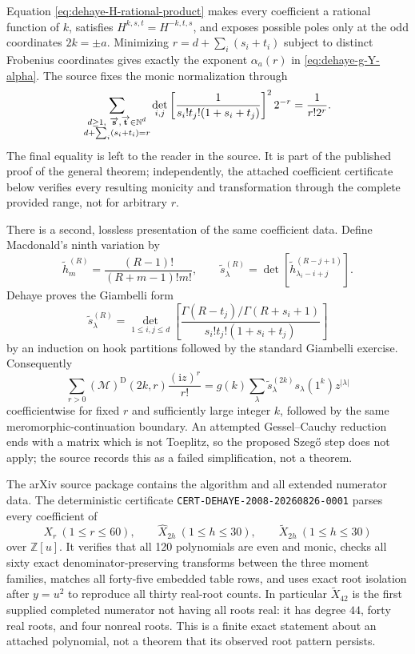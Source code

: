 Equation \eqref{eq:dehaye-H-rational-product} makes every coefficient a rational
function of $k$, satisfies $H^{k,s,t}=H^{-k,t,s}$, and exposes possible poles only
at the odd coordinates $2k=\pm a$.  Minimizing
$r=d+\sum_i(s_i+t_i)$ subject to distinct Frobenius coordinates gives exactly the
exponent $\alpha_a(r)$ in \eqref{eq:dehaye-g-Y-alpha}.  The source fixes the monic
normalization through
\begin{equation}
 \sum_{\substack{d\geq1,\ \sort{s},\sort{t}\in\mathbb N^d\\
 d+\sum_i(s_i+t_i)=r}}
 \det_{i,j}\left[\frac1{s_i!t_j!(1+s_i+t_j)}\right]^2
 2^{-r}=\frac1{r!2^r}.
 \label{eq:dehaye-monic-normalization-sum}
\end{equation}
The final equality is left to the reader in the source.  It is part of the published
proof of the general theorem; independently, the attached coefficient certificate
below verifies every resulting monicity and transformation through the complete
provided range, not for arbitrary $r$.

There is a second, lossless presentation of the same coefficient data.  Define
Macdonald's ninth variation by
\[
 \widetilde h_m^{(R)}=\frac{(R-1)!}{(R+m-1)!m!},\qquad
 \widetilde s_\lambda^{(R)}=
 \det\left[\widetilde h_{\lambda_i-i+j}^{(R-j+1)}\right].
\]
Dehaye proves the Giambelli form
\begin{equation}
 \widetilde s_\lambda^{(R)}
 =\det_{1\leq i,j\leq d}
 \left[\frac{\Gamma(R-t_j)/\Gamma(R+s_i+1)}
 {s_i!t_j!(1+s_i+t_j)}\right]
 \label{eq:dehaye-ninth-variation-giambelli}
\end{equation}
by an induction on hook partitions followed by the standard Giambelli exercise.
Consequently
\begin{equation}
 \sum_{r>0}(\mathcal M)^{\mathrm D}(2k,r)\frac{(\mathrm iz)^r}{r!}
 =g(k)\sum_\lambda \widetilde s_\lambda^{(2k)}s_\lambda(1^k)z^{|\lambda|}
 \label{eq:dehaye-ninth-variation-series}
\end{equation}
coefficientwise for fixed $r$ and sufficiently large integer $k$, followed by the
same meromorphic-continuation boundary.  An attempted Gessel--Cauchy reduction ends
with a matrix which is not Toeplitz, so the proposed Szeg\H{o} step does not apply;
the source records this as a failed simplification, not a theorem.

The arXiv source package contains the algorithm and all extended numerator data.
The deterministic certificate
\texttt{CERT-DEHAYE-2008-20260826-0001} parses every coefficient of
\[
 X_r\ (1\leq r\leq60),\qquad
 \widehat X_{2h}\ (1\leq h\leq30),\qquad
 \widetilde X_{2h}\ (1\leq h\leq30)
\]
over $\mathbb Z[u]$.  It verifies that all 120 polynomials are even and monic,
checks all sixty exact denominator-preserving transforms between the three moment
families, matches all forty-five embedded table rows, and uses exact root isolation
after $y=u^2$ to reproduce all thirty real-root counts.  In particular
$\widetilde X_{42}$ is the first supplied completed numerator not having all roots
real: it has degree $44$, forty real roots, and four nonreal roots.  This is a finite
exact statement about an attached polynomial, not a theorem that its observed root
pattern persists.

